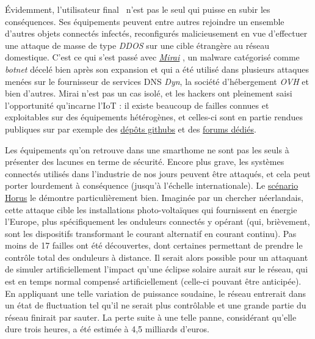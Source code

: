 \documentclass[]{article}
\begin{document}
\newpage

\par Évidemment, l'utilisateur \og final \fg \ n'est pas le seul qui puisse en subir les conséquences. Ses équipements peuvent entre autres rejoindre un ensemble d'autres  objets connectés infectés, reconfigurés malicieusement en vue d'effectuer une attaque de masse de type \textit{DDOS} sur une cible étrangère au réseau domestique. C'est ce qui s'est passé avec \href{https://en.wikipedia.org/wiki/Mirai_(malware)}{\textit{Mirai}} \cite{wikiMirai}, un malware catégorisé comme \textit{botnet} décelé bien après son expansion et qui a été utilisé dans plusieurs attaques menées sur le fournisseur de services DNS \textit{Dyn}, la société d'hébergement \textit{OVH} et bien d'autres. Mirai n'est pas un cas isolé, et les hackers ont pleinement saisi l'opportunité qu'incarne l'IoT : il existe beaucoup de failles connues et exploitables sur des équipements hétérogènes, et celles-ci sont en partie rendues publiques sur par exemple des \href{https://github.com/nebgnahz/awesome-iot-hacks}{dépôts githubs} et des \href{https://hackforums.net/forumdisplay.php?fid=193}{forums dédiés}.\\

\par Les équipements qu'on retrouve dans une smarthome ne sont pas les seuls à présenter des lacunes en terme de sécurité. Encore plus grave, les systèmes connectés utilisés dans l'industrie de nos jours peuvent être attaqués, et cela peut porter lourdement à conséquence (jusqu'à l'échelle internationale). Le \href{https://horusscenario.com/}{scénario Horus} \cite{wikiHorus} le démontre particulièrement bien. Imaginée par un chercher néerlandais, cette attaque cible les installations photo-voltaïques qui fournissent en énergie l'Europe, plus spécifiquement les onduleurs connectés y opérant (qui, brièvement, sont les dispositifs transformant le courant alternatif en courant continu). Pas moins de 17 failles ont été découvertes, dont certaines permettant de prendre le contrôle total des onduleurs à distance. Il serait alors possible pour un attaquant de simuler artificiellement l'impact qu'une éclipse solaire aurait sur le réseau, qui est en temps normal compensé artificiellement (celle-ci pouvant être anticipée). En appliquant une telle variation de puissance soudaine, le réseau entrerait dans un état de fluctuation tel qu'il ne serait plus contrôlable et une grande partie du réseau finirait par sauter. La perte suite à une telle panne, considérant qu'elle dure trois heures, a été estimée à 4,5 milliards d'euros.
\end{document}
